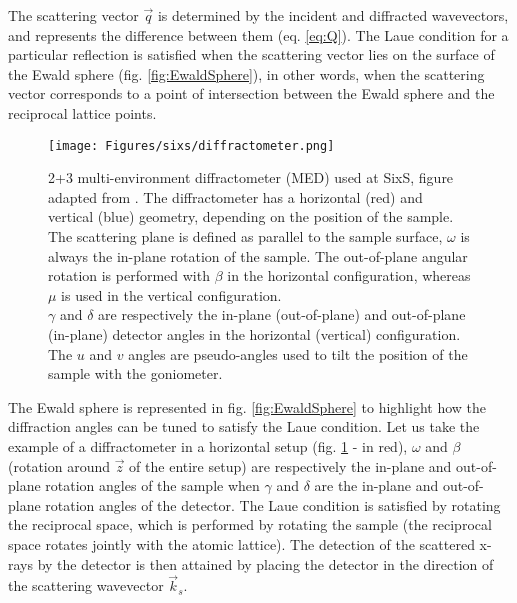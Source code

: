 The scattering vector $\vec{q}$ is determined by the incident and diffracted wavevectors, and represents the difference between them (eq. \ref{eq:Q}).
The Laue condition for a particular reflection is satisfied when the scattering vector lies on the surface of the Ewald sphere (fig. \ref{fig:EwaldSphere}), in other words, when the scattering vector corresponds to a point of intersection between the Ewald sphere and the reciprocal lattice points.

\begin{figure}[!htb]
    \centering
    \texttt{[image: Figures/sixs/diffractometer.png]}
    \caption{
    2+3 multi-environment diffractometer (MED) used at SixS, figure adapted from \cite{Schleputz2011}.
    The diffractometer has a horizontal (red) and vertical (blue) geometry, depending on the position of the sample.\\
    The scattering plane is defined as parallel to the sample surface, $\omega$ is always the in-plane rotation of the sample.
    The out-of-plane angular rotation is performed with $\beta$ in the horizontal configuration, whereas $\mu$ is used in the vertical configuration.\\
    $\gamma$ and $\delta$ are respectively the in-plane (out-of-plane) and out-of-plane (in-plane) detector angles in the horizontal (vertical) configuration.\\
    The $u$ and $v$ angles are pseudo-angles used to tilt the position of the sample with the goniometer.
    }
    \label{fig:Diffractometer}
\end{figure}

The Ewald sphere is represented in fig. \ref{fig:EwaldSphere} to highlight how the diffraction angles can be tuned to satisfy the Laue condition.
Let us take the example of a diffractometer in a horizontal setup (fig. \ref{fig:Diffractometer} - in red), $\omega$ and $\beta$ (rotation around $\vec{z}$ of the entire setup) are respectively the in-plane and out-of-plane rotation angles of the sample when $\gamma$ and $\delta$ are the in-plane and out-of-plane rotation angles of the detector.
The Laue condition is satisfied by rotating the reciprocal space, which is performed by rotating the sample (the reciprocal space rotates jointly with the atomic lattice).
The detection of the scattered x-rays by the detector is then attained by placing the detector in the direction of the scattering wavevector $\vec{k}_s$.

